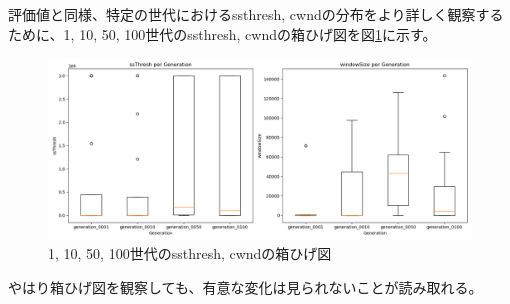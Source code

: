 \documentclass[a4paper,11pt]{jreport}
\newcommand{\figref}[1]{図\ref{#1}}
\begin{document}
評価値と同様、特定の世代におけるssthresh, cwndの分布をより詳しく観察するために、1, 10, 50, 100世代のssthresh, cwndの箱ひげ図を\figref{figure:boxplot}に示す。
\begin{figure}[thbp]
  \setlength\fboxsep{0pt}
  \centering
  \includegraphics[width=1.0\linewidth]{fig/chap05/boxplot.png}
  \caption{1, 10, 50, 100世代のssthresh, cwndの箱ひげ図}
  \label{figure:boxplot}
\end{figure}
やはり箱ひげ図を観察しても、有意な変化は見られないことが読み取れる。

\newpage
\end{document}
